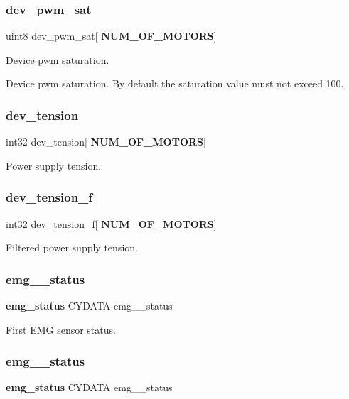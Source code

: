 \subsubsection{dev\+\_\+pwm\+\_\+sat}
{\footnotesize\ttfamily uint8 dev\+\_\+pwm\+\_\+sat[\textbf{ N\+U\+M\+\_\+\+O\+F\+\_\+\+M\+O\+T\+O\+RS}]}

Device pwm saturation.

Device pwm saturation. By default the saturation value must not exceed 100. \mbox{\label{globals_8h_aada869b6650bdd87ca481109ae08231c}} 
\subsubsection{dev\+\_\+tension}
{\footnotesize\ttfamily int32 dev\+\_\+tension[\textbf{ N\+U\+M\+\_\+\+O\+F\+\_\+\+M\+O\+T\+O\+RS}]}

Power supply tension. \mbox{\label{globals_8h_aa2494c7cd8f096ca7f2ead0a1430a597}} 
\subsubsection{dev\+\_\+tension\+\_\+f}
{\footnotesize\ttfamily int32 dev\+\_\+tension\+\_\+f[\textbf{ N\+U\+M\+\_\+\+O\+F\+\_\+\+M\+O\+T\+O\+RS}]}

Filtered power supply tension. \mbox{\label{globals_8h_a433230c4343adf14967e6f4f9082b199}} 
\subsubsection{emg\+\_\+\_\+status}
{\footnotesize\ttfamily \textbf{ emg\+\_\+status} C\+Y\+D\+A\+TA emg\+\_\+\_\+status}

First E\+MG sensor status. \mbox{\label{globals_8h_a7eef8180f636a73854d52b58e2be4e51}} 
\subsubsection{emg\+\_\+\_\+status}
{\footnotesize\ttfamily \textbf{ emg\+\_\+status} C\+Y\+D\+A\+TA emg\+\_\+\_\+status}

